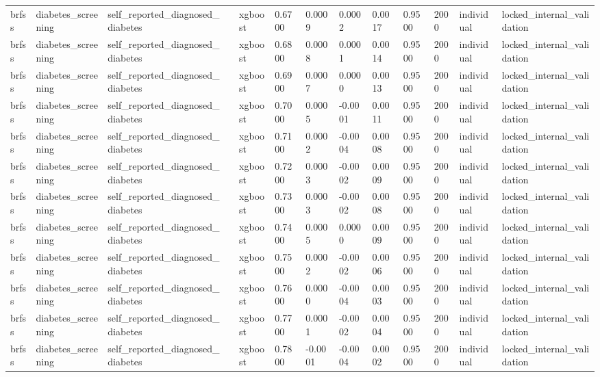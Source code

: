 \begin{tabular}{lllllllllllll}
brfss & diabetes\_screening & self\_reported\_diagnosed\_diabetes &  & xgboost & 0.6700 & 0.0009 & 0.0002 & 0.0017 & 0.9500 & 2000 & individual & locked\_internal\_validation \\
brfss & diabetes\_screening & self\_reported\_diagnosed\_diabetes &  & xgboost & 0.6800 & 0.0008 & 0.0001 & 0.0014 & 0.9500 & 2000 & individual & locked\_internal\_validation \\
brfss & diabetes\_screening & self\_reported\_diagnosed\_diabetes &  & xgboost & 0.6900 & 0.0007 & 0.0000 & 0.0013 & 0.9500 & 2000 & individual & locked\_internal\_validation \\
brfss & diabetes\_screening & self\_reported\_diagnosed\_diabetes &  & xgboost & 0.7000 & 0.0005 & -0.0001 & 0.0011 & 0.9500 & 2000 & individual & locked\_internal\_validation \\
brfss & diabetes\_screening & self\_reported\_diagnosed\_diabetes &  & xgboost & 0.7100 & 0.0002 & -0.0004 & 0.0008 & 0.9500 & 2000 & individual & locked\_internal\_validation \\
brfss & diabetes\_screening & self\_reported\_diagnosed\_diabetes &  & xgboost & 0.7200 & 0.0003 & -0.0002 & 0.0009 & 0.9500 & 2000 & individual & locked\_internal\_validation \\
brfss & diabetes\_screening & self\_reported\_diagnosed\_diabetes &  & xgboost & 0.7300 & 0.0003 & -0.0002 & 0.0008 & 0.9500 & 2000 & individual & locked\_internal\_validation \\
brfss & diabetes\_screening & self\_reported\_diagnosed\_diabetes &  & xgboost & 0.7400 & 0.0005 & 0.0000 & 0.0009 & 0.9500 & 2000 & individual & locked\_internal\_validation \\
brfss & diabetes\_screening & self\_reported\_diagnosed\_diabetes &  & xgboost & 0.7500 & 0.0002 & -0.0002 & 0.0006 & 0.9500 & 2000 & individual & locked\_internal\_validation \\
brfss & diabetes\_screening & self\_reported\_diagnosed\_diabetes &  & xgboost & 0.7600 & 0.0000 & -0.0004 & 0.0003 & 0.9500 & 2000 & individual & locked\_internal\_validation \\
brfss & diabetes\_screening & self\_reported\_diagnosed\_diabetes &  & xgboost & 0.7700 & 0.0001 & -0.0002 & 0.0004 & 0.9500 & 2000 & individual & locked\_internal\_validation \\
brfss & diabetes\_screening & self\_reported\_diagnosed\_diabetes &  & xgboost & 0.7800 & -0.0001 & -0.0004 & 0.0002 & 0.9500 & 2000 & individual & locked\_internal\_validation \\

\end{tabular}
